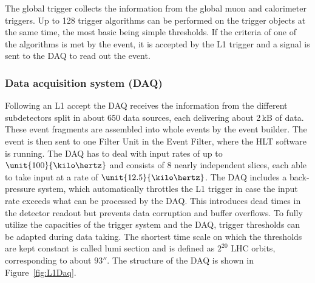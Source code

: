The global trigger collects the information from the global muon and calorimeter triggers. Up to 128 trigger algorithms can be performed on the trigger objects at the same time, the most basic being simple \pt thresholds. If the criteria of one of the algorithms is met by the event, it is accepted by the L1 trigger and a signal is sent to the DAQ to read out the event.  


\subsubsection*{Data acquisition system (DAQ)}
Following an L1 accept the DAQ receives the information from the different subdetectors split in about 650 data sources, each delivering about 2\,kB of data. These event fragments are assembled into whole events by the event builder. The event is then sent to one Filter Unit in the Event Filter, where the HLT software is running. The DAQ has to deal with input rates of up to $\unit{100}{\kilo\hertz}$ and consists of 8 nearly independent slices, each able to take input at a rate of $\unit{12.5}{\kilo\hertz}$. The DAQ includes a back-pressure system, which automatically throttles the L1 trigger in case the input rate exceeds what can be processed by the DAQ. This introduces dead times in the detector readout but prevents data corruption and buffer overflows. To fully utilize the capacities of the trigger system and the DAQ, trigger thresholds can be adapted during data taking. The shortest time scale on which the thresholds are kept constant is called lumi section and is defined as $2^{20}$ LHC orbits, corresponding to about $\unit{93}{\second}$. The structure of the DAQ is shown in Figure~\ref{fig:L1Daq}.

